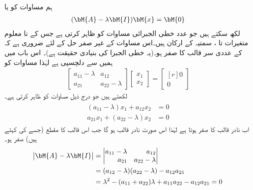 ہم مساوات  کو  یا 
\begin{align}\label{مساوات_نظام_امتیازی_ب}
(\bM{A}-\lambda \bM{I})\bM{x}=\bM{0}
\end{align}
لکھ سکتے ہیں جو  عدد خطی الجبرائی مساوات کو ظاہر کرتی ہے جس کے نا معلوم متغیرات  تا ، سمتیہ  کے ارکان ہیں۔اس مساوات کے غیر صفر حل  کے لئے ضروری ہے کہ  کے عددی سر قالب کا  صفر ہو۔(یہ خطی الجبرا کی بنیادی حقیقت ہے)۔ اس باب میں ہمیں   سے دلچسپی ہے لہٰذا مساوات  کو
\begin{align}\label{مساوات_نظام_امتیازی_پ}
\begin{bmatrix*}
a_{11}-\lambda& a_{12}\\
a_{21}& a_{22}-\lambda
\end{bmatrix*}
\begin{bmatrix*}
x_1\\
x_2
\end{bmatrix*}=
\begin{bmatrix*}[r]
0\\
0
\end{bmatrix*}
\end{align}
لکھتے ہیں جو درج ذیل مساوات کو ظاہر کرتی ہے۔
\begin{gather}\label{مساوات_نظام_امتیازی_ت}
\begin{aligned}
(a_{11}-\lambda)x_1+a_{12}x_2&=0\\
a_{21}x_1+(a_{22}-\lambda)x_2&=0
\end{aligned}
\end{gather}
اب نادر قالب کا  صفر ہوتا ہے لہٰذا   اس صورت نادر قالب ہو گا جب اس قالب کا مقطع (جسے  کی  کہتے ہیں) صفر ہو۔
\begin{gather}\label{مساوات_نظام_امتیازی_ٹ}
\begin{aligned}
\abs{\bM{A}-\lambda \bM{I}}&=
\begin{vmatrix*}[r]
a_{11}-\lambda& a_{12}\\
a_{21}& a_{22}-\lambda
\end{vmatrix*}\\
&=(a_{12}-\lambda)(a_{22}-\lambda)-a_{12}a_{21}\\
&=\lambda^2-(a_{11}+a_{22})\lambda+a_{11}a_{22}-a_{12}a_{21}=0
\end{aligned}
\end{gather}
